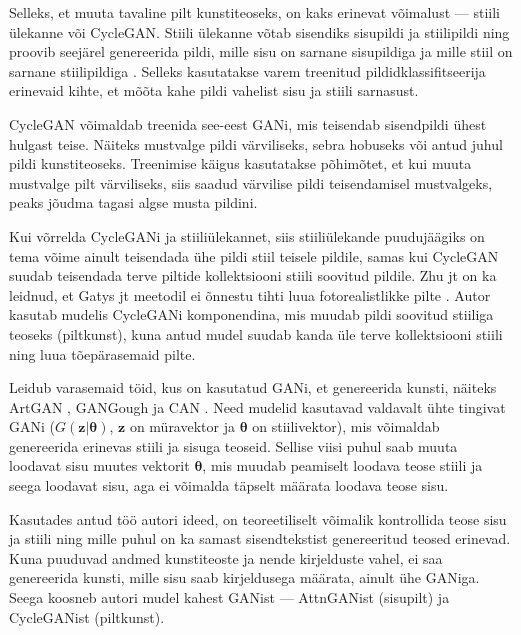 \documentclass{vilgym}
\begin{document}
	Selleks, et muuta tavaline pilt kunstiteoseks, on kaks erinevat võimalust --- stiili ülekanne või CycleGAN. Stiili ülekanne võtab sisendiks sisupildi ja stiilipildi ning proovib seejärel genereerida pildi, mille sisu on sarnane sisupildiga ja mille stiil on sarnane stiilipildiga \parencite{styletransfer}. Selleks kasutatakse varem treenitud pildidklassifitseerija erinevaid kihte, et mõõta kahe pildi vahelist sisu ja stiili sarnasust. 

	CycleGAN võimaldab treenida see-eest GANi, mis teisendab sisendpildi ühest hulgast teise. Näiteks mustvalge pildi värviliseks, sebra hobuseks või antud juhul pildi kunstiteoseks. Treenimise käigus kasutatakse põhimõtet, et kui muuta mustvalge pilt värviliseks, siis saadud värvilise pildi teisendamisel mustvalgeks, peaks jõudma tagasi algse musta pildini. \parencite{cyclegan}

	Kui võrrelda CycleGANi ja stiiliülekannet, siis stiiliülekande puudujäägiks on tema võime ainult teisendada ühe pildi stiil teisele pildile, samas kui CycleGAN suudab teisendada terve piltide kollektsiooni stiili soovitud pildile. Zhu jt on ka leidnud, et Gatys jt meetodil ei õnnestu tihti luua fotorealistlikke pilte \parencite{cyclegan}. Autor kasutab mudelis CycleGANi komponendina, mis muudab pildi soovitud stiiliga teoseks (pilt\textrightarrow kunst), kuna antud mudel suudab kanda üle terve kollektsiooni stiili ning luua tõepärasemaid pilte.

	Leidub varasemaid töid, kus on kasutatud GANi, et genereerida kunsti, näiteks ArtGAN \parencite{artgan}, GANGough \parencite{gangough} ja CAN \parencite{can}. Need mudelid kasutavad valdavalt ühte tingivat GANi ($ G(\boldsymbol{z}|\boldsymbol{\theta}) $, $ \boldsymbol{z} $ on müravektor ja $ \boldsymbol{\theta} $ on stiilivektor), mis võimaldab genereerida erinevas stiili ja sisuga teoseid. Sellise viisi puhul saab muuta loodavat sisu muutes vektorit $ \boldsymbol{\theta} $, mis muudab peamiselt loodava teose stiili ja seega loodavat sisu, aga ei võimalda täpselt määrata loodava teose sisu. 

	Kasutades antud töö autori ideed, on teoreetiliselt võimalik kontrollida teose sisu ja stiili ning mille puhul on ka samast sisendtekstist genereeritud teosed erinevad. Kuna puuduvad andmed kunstiteoste ja nende kirjelduste vahel, ei saa genereerida kunsti, mille sisu saab kirjeldusega määrata, ainult ühe GANiga. Seega koosneb autori mudel kahest GANist --- AttnGANist (sisu\textrightarrow pilt) ja CycleGANist (pilt\textrightarrow kunst). %
\end{document}
